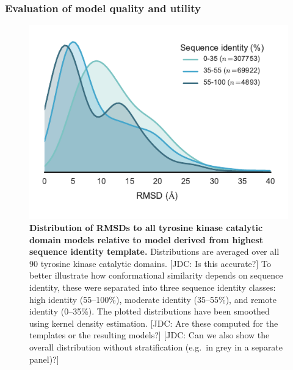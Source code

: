 \documentclass[aps,pre,twocolumn,nofootinbib,superscriptaddress,linenumbers]{revtex4-1}
\begin{document}
\subsubsection*{Evaluation of model quality and utility}


\begin{figure}[tbp]
    \includegraphics[width=1.0\columnwidth]{rmsddist/rmsddist2.pdf}

    \caption{{\bf Distribution of RMSDs to all tyrosine kinase catalytic domain models relative to model derived from highest sequence identity template.}    
    Distributions are averaged over all 90 tyrosine kinase catalytic domains.
    {\color{red}[JDC: Is this accurate?]}
    To better illustrate how conformational similarity depends on sequence identity, these were separated into three sequence identity classes: high identity (55--100\%), moderate identity (35--55\%), and remote identity (0--35\%).
    The plotted distributions have been smoothed using kernel density estimation.
    {\color{red}[JDC: Are these computed for the templates or the resulting models?]}
    {\color{red}[JDC: Can we also show the overall distribution without stratification (e.g.~in grey in a separate panel)?]}
  }
  \label{figure:rmsd-distribution-by-sequence-identity}
\end{figure}
\end{document}
